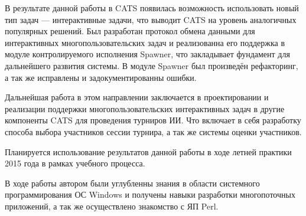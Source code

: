 \documentclass{imcs}
\begin{document}
В результате данной работы в CATS появилась возможность использовать новый тип задач --- интерактивные задачи, что выводит CATS на уровень аналогичных популярных решений. Был разработан протокол обмена данными для интерактивных многопользовательских задач и реализованна его поддержка в модуле контролируемого исполнения Spawner, что закладывает фундамент для дальнейшего развития системы. В модуле Spawner был произведён рефакторинг, а так же исправлены и задокументированны ошибки.

Дальнейшая работа в этом направлении заключается в проектировании и реализации поддержки многопользовательских интерактивных задач в другие компоненты CATS для проведения турниров ИИ. Что включает в себя разработку способа выбора участников сессии турнира, а так же системы оценки участников.

Планируется использование результатов данной работы в ходе летней практики 2015 года в рамках учебного процесса.

В ходе работы автором были углубленны знания в области системного программирования ОС Windows и получены навыки разработки многопоточных приложений, а так же осуществлено знакомство с ЯП Perl.

\pagebreak
\end{document}

